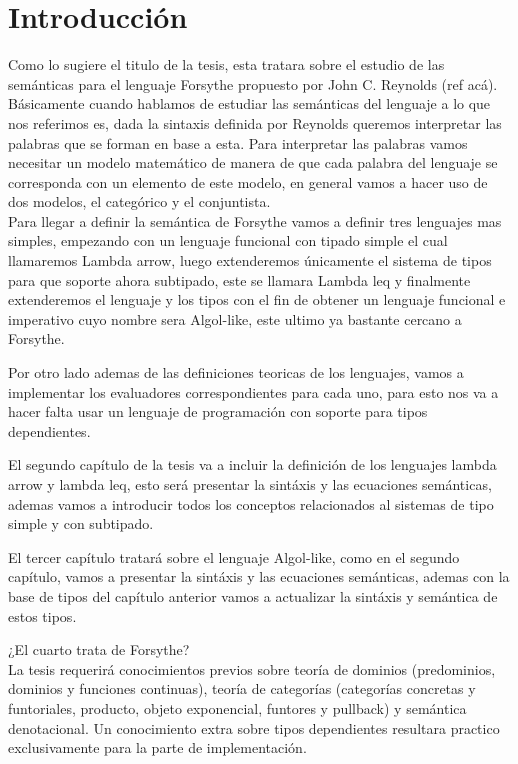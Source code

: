 \chapter{Introducci\'on}
\label{chap:intro}

Como lo sugiere el titulo de la tesis, esta tratara sobre el estudio
de las sem\'anticas para el lenguaje Forsythe propuesto por John C. Reynolds
(ref ac\'a). B\'asicamente cuando hablamos de estudiar las sem\'anticas del 
lenguaje a lo que nos referimos es, dada la sintaxis definida por Reynolds
queremos interpretar las palabras que se forman en base a esta. Para interpretar
las palabras vamos necesitar un modelo matem\'atico de manera de que
cada palabra del lenguaje se corresponda con un elemento de este modelo, 
en general vamos a hacer uso de dos modelos, el categ\'orico y el conjuntista.\\

Para llegar a definir la sem\'antica de Forsythe vamos a definir tres lenguajes
mas simples, empezando con un lenguaje funcional con tipado simple el cual 
llamaremos Lambda arrow, luego extenderemos \'unicamente el sistema de tipos para 
que soporte ahora subtipado, este se llamara Lambda leq y finalmente extenderemos 
el lenguaje y los tipos con el fin de obtener un lenguaje funcional e imperativo 
cuyo nombre sera Algol-like, este ultimo ya bastante cercano a Forsythe. 

Por otro lado ademas de las definiciones teoricas de los lenguajes, vamos a 
implementar los evaluadores correspondientes para cada uno, para esto nos va a 
hacer falta usar un lenguaje de programación con soporte para tipos dependientes.

El segundo cap\'itulo de la tesis va a incluir la definici\'on de los lenguajes
lambda arrow y lambda leq, esto ser\'a presentar la sint\'axis y las ecuaciones
sem\'anticas, ademas vamos a introducir todos los conceptos relacionados al 
sistemas de tipo simple y con subtipado.

El tercer cap\'itulo tratar\'a sobre el lenguaje Algol-like, como en el segundo
cap\'itulo, vamos a presentar la sint\'axis y las ecuaciones sem\'anticas, ademas
con la base de tipos del cap\'itulo anterior vamos a actualizar la sint\'axis y
sem\'antica de estos tipos.

¿El cuarto trata de Forsythe?\\

La tesis requerir\'a conocimientos previos sobre teor\'ia de dominios 
(predominios, dominios y funciones continuas), teor\'ia
de categor\'ias (categor\'ias concretas y funtoriales, producto, 
objeto exponencial, funtores y pullback) y sem\'antica denotacional. Un
conocimiento extra sobre tipos dependientes resultara practico exclusivamente
para la parte de implementaci\'on.
